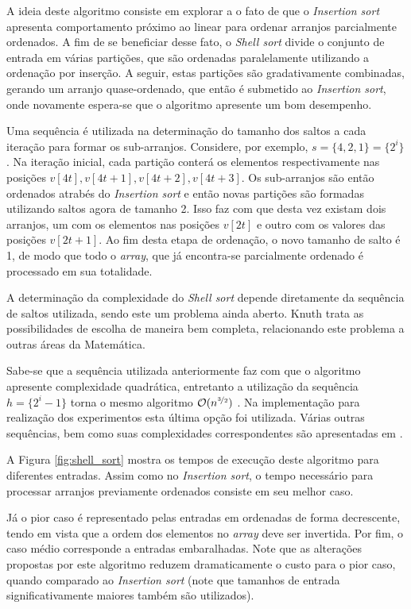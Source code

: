 \documentclass[12pt]{article}
\begin{document}
A ideia deste algoritmo consiste em explorar a o fato de que o \textit{Insertion sort} apresenta comportamento próximo ao linear para ordenar arranjos parcialmente ordenados. A fim de se beneficiar desse fato, o \textit{Shell sort} divide o conjunto de entrada em várias partições, que são ordenadas paralelamente utilizando a ordenação por inserção. A seguir, estas partições são gradativamente combinadas, gerando um arranjo quase-ordenado, que então é submetido ao \textit{Insertion sort}, onde novamente espera-se que o algoritmo apresente um bom desempenho.

Uma sequência é utilizada na determinação do tamanho dos saltos a cada iteração para formar os sub-arranjos. Considere, por exemplo, $s = \{4, 2, 1\} = \{2^i\}$. Na iteração inicial, cada partição conterá os elementos respectivamente nas posições $v[4t], v[4t+1], v[4t+2], v[4t+3]$. 
Os sub-arranjos são então ordenados atrabés do \textit{Insertion sort} e então novas partições são formadas utilizando saltos agora de tamanho 2. Isso faz com que desta vez existam dois arranjos, um com os elementos nas posições $v[2t]$ e outro com os valores das posições $v[2t+1]$. Ao fim desta etapa de ordenação, o novo tamanho de salto é 1, de modo que todo o \textit{array}, que já encontra-se parcialmente ordenado é processado em sua totalidade.

A determinação da complexidade do \textit{Shell sort} depende diretamente da sequência de saltos utilizada, sendo este um problema ainda aberto. Knuth \cite{art_cc3} trata as possibilidades de escolha de maneira bem completa, relacionando este problema a outras áreas da Matemática.

Sabe-se que a sequência utilizada anteriormente faz com que o algoritmo apresente complexidade quadrática, entretanto a utilização da sequência $h = \{2^i-1\}$ torna o mesmo algoritmo $\mathcal{O}(n^{\nicefrac{3}{2}})$ \cite{hibbard_sequence}. Na implementação para realização dos experimentos esta última opção foi utilizada. Várias outras sequências, bem como suas complexidades correspondentes são apresentadas em \cite{shellsort_analysis}.

A Figura \ref{fig:shell_sort} mostra os tempos de execução deste algoritmo para diferentes entradas. Assim como no \textit{Insertion sort}, o tempo necessário para processar arranjos previamente ordenados consiste em seu melhor caso.

Já o pior caso é representado pelas entradas em ordenadas de forma decrescente, tendo em vista que a ordem dos elementos no \textit{array} deve ser invertida. Por fim, o caso médio corresponde a entradas embaralhadas. Note que as alterações propostas por este algoritmo reduzem dramaticamente o custo para o pior caso, quando comparado ao \textit{Insertion sort} (note que tamanhos de entrada significativamente maiores também são utilizados).
\end{document}
